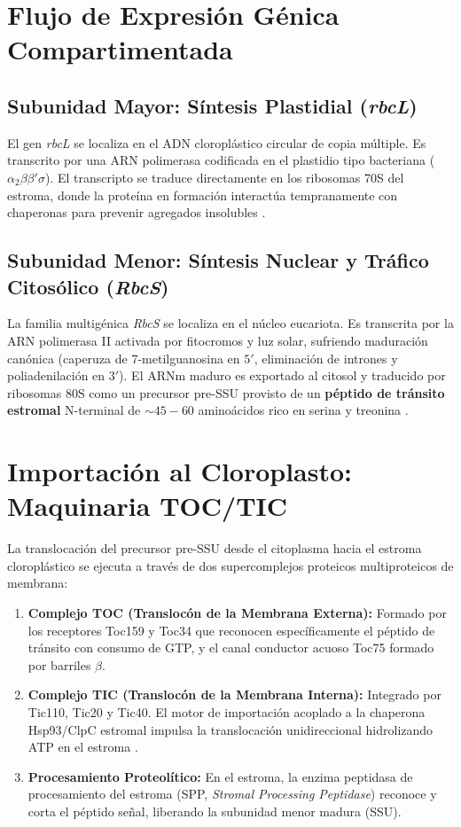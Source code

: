 \documentclass[spanish,letterpaper,oneside]{article}
\begin{document}
\section{Flujo de Expresión Génica Compartimentada}
\subsection{Subunidad Mayor: Síntesis Plastidial (\textit{rbcL})}
El gen \textit{rbcL} se localiza en el ADN cloroplástico circular de copia múltiple. Es transcrito por una ARN polimerasa codificada en el plastidio tipo bacteriana ($\alpha_2\beta\beta'\sigma$). El transcripto se traduce directamente en los ribosomas 70S del estroma, donde la proteína en formación interactúa tempranamente con chaperonas para prevenir agregados insolubles \parencite{alberts2015}.

\subsection{Subunidad Menor: Síntesis Nuclear y Tráfico Citosólico (\textit{RbcS})}
La familia multigénica \textit{RbcS} se localiza en el núcleo eucariota. Es transcrita por la ARN polimerasa II activada por fitocromos y luz solar, sufriendo maduración canónica (caperuza de 7-metilguanosina en $5'$, eliminación de intrones y poliadenilación en $3'$). El ARNm maduro es exportado al citosol y traducido por ribosomas 80S como un precursor pre-SSU provisto de un \textbf{péptido de tránsito estromal} N-terminal de $\sim 45-60$ aminoácidos rico en serina y treonina \parencite{lodish2016}.

\section{Importación al Cloroplasto: Maquinaria TOC/TIC}
La translocación del precursor pre-SSU desde el citoplasma hacia el estroma cloroplástico se ejecuta a través de dos supercomplejos proteicos multiproteicos de membrana:
\begin{enumerate}
    \item \textbf{Complejo TOC (Translocón de la Membrana Externa):} Formado por los receptores Toc159 y Toc34 que reconocen específicamente el péptido de tránsito con consumo de GTP, y el canal conductor acuoso Toc75 formado por barriles $\beta$.
    \item \textbf{Complejo TIC (Translocón de la Membrana Interna):} Integrado por Tic110, Tic20 y Tic40. El motor de importación acoplado a la chaperona Hsp93/ClpC estromal impulsa la translocación unidireccional hidrolizando ATP en el estroma \parencite{lodish2016}.
    \item \textbf{Procesamiento Proteolítico:} En el estroma, la enzima peptidasa de procesamiento del estroma (SPP, \textit{Stromal Processing Peptidase}) reconoce y corta el péptido señal, liberando la subunidad menor madura (SSU).
\end{enumerate}
\end{document}
